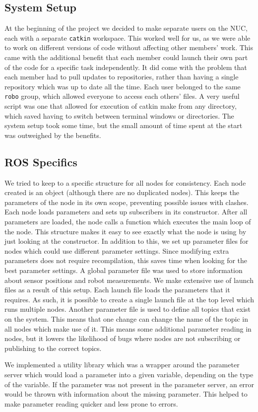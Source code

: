 \documentclass[10pt,a4paper,twocolumn]{article}
\begin{document}
\subsection{System Setup}
At the beginning of the project we decided to make separate users on the NUC,
each with a separate \texttt{catkin} workspace. This worked well for us, as we
were able to work on different versions of code without affecting other members'
work. This came with the additional benefit that each member could launch their
own part of the code for a specific task independently. It did come with the
problem that each member had to pull updates to repositories, rather than having
a single repository which was up to date all the time. Each user belonged to the
same \texttt{robo} group, which allowed everyone to access each others' files. A
very useful script was one that allowed for execution of catkin make from any
directory, which saved having to switch between terminal windows or directories.
The system setup took some time, but the small amount of time spent at
the start was outweighed by the benefits.

\subsection{ROS Specifics}
We tried to keep to a specific structure for all nodes for consistency. Each
node created is an object (although there are no duplicated nodes). This keeps
the parameters of the node in its own scope, preventing possible issues with
clashes. Each node loads parameters and sets up subscribers in its constructor.
After all parameters are loaded, the node calls a function which executes the
main loop of the node. This structure makes it easy to see exactly what the node
is using by just looking at the constructor. In addition to this, we set up
parameter files for nodes which could use different parameter settings. Since
modifying extra parameters does not require recompilation, this saves time when
looking for the best parameter settings. A global parameter file was used to
store information about sensor positions and robot measurements. We make
extensive use of launch files as a result of this setup. Each launch file loads
the parameters that it requires. As such, it is possible to create a single
launch file at the top level which runs multiple nodes. Another parameter file
is used to define all topics that exist on the system. This means that one
change can change the name of the topic in all nodes which make use of it. This
means some additional parameter reading in nodes, but it lowers the likelihood
of bugs where nodes are not subscribing or publishing to the correct topics.

We implemented a utility library which was a wrapper around the parameter server
which would load a parameter into a given variable, depending on the type of the
variable. If the parameter was not present in the parameter server, an error
would be thrown with information about the missing parameter. This helped to
make parameter reading quicker and less prone to errors.

\nocite{*}
\printbibliography
\end{document}
